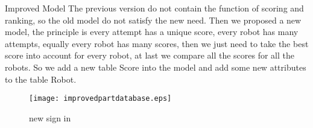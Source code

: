 \item{Improved Model}
The previous version do not contain the function of scoring and ranking, so the old model do not satisfy the new need. Then we proposed a new model, the principle is every attempt has a unique score, every robot has many attempts, equally every robot has many scores, then we just need to take the best score into account for every robot, at last we compare all the scores for all the robots. So we add a new table Score into the model and add some new attributes to the table Robot.
\begin{figure}[h!]
\centering
\texttt{[image: improvedpartdatabase.eps]}
\caption{new sign in }
\label{fig-sample}
\end{figure}